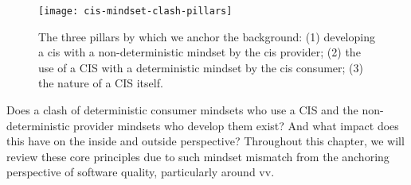 \begin{figure}[hbt]
  \centering
  \texttt{[image: cis-mindset-clash-pillars]}
  \caption[Mindset clashes within the development, use and nature of a CIS]{The three pillars by which we anchor the background: (1) developing a \gls{cis} with a non-deterministic mindset by the \gls{cis} provider; (2) the use of a CIS with a deterministic mindset by the \gls{cis} consumer; (3) the nature of a CIS itself.}
  \label{fig:background:preface:cis-mindset-clash-pillars}
\end{figure}

Does a clash of deterministic consumer mindsets who use a CIS and the non-deterministic provider mindsets who develop them exist? And what impact does this have on the inside and outside perspective? Throughout this chapter, we will review these core principles due to such  mindset mismatch from the anchoring perspective of software quality, particularly around \gls{vv}.
